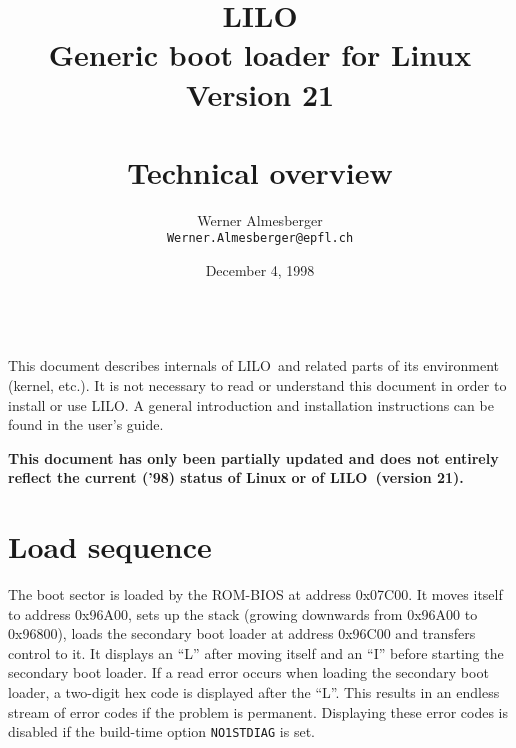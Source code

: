 %
%
%


\parindent=0pt
\parskip=4pt


\def\key#1{$[$#1$]$}
\def\LILO{LILO}

\def\SetFigFont#1#2#3{\tt}




\title{\LILO \\
  \Large
  Generic boot loader for Linux \\
  Version 21 \\ ~\\
  \bf Technical overview}
\author{Werner Almesberger \\
  {\tt Werner.Almesberger@epfl.ch}}
\date{December 4, 1998}

\maketitle
{
  \parskip=-4pt
  \setcounter{tocdepth}{1}
  \tableofcontents
}

~\\
This document describes internals of \LILO\ and related parts of its
environment (kernel, etc.). It is not necessary to read or understand
this document in order to install or use \LILO. A general introduction
and installation instructions can be found in the user's guide.

{\bf This document has only been partially updated and does not entirely
reflect the current ('98) status of Linux or of \LILO\ (version 21).}


\section{Load sequence}
\label{load}

The boot sector is loaded by the ROM-BIOS at address 0x07C00. It moves
itself to address 0x96A00, sets up the stack (growing downwards from
0x96A00 to 0x96800), loads the secondary boot loader at address
0x96C00 and transfers control to it. It displays an ``L'' after moving
itself and an ``I'' before starting the secondary boot loader. If a read
error occurs when loading the secondary boot loader, a two-digit hex code
is displayed after the ``L''. This results in an endless stream of error
codes if the problem is permanent. Displaying these error codes is disabled
if the build-time option {\tt NO1STDIAG} is set.

